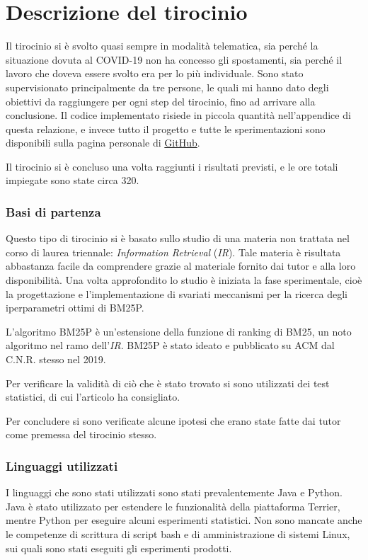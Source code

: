 \chapter{Descrizione del tirocinio}

Il tirocinio si è svolto quasi sempre in modalità telematica,
sia perché la situazione dovuta al COVID-19 non ha concesso
gli spostamenti, sia perché  il lavoro che doveva essere svolto
era per lo più individuale.
Sono stato supervisionato principalmente da tre persone,
le quali mi hanno dato degli obiettivi da raggiungere per ogni
step del tirocinio,
fino ad arrivare alla conclusione.
Il codice implementato risiede in piccola
quantità nell'appendice di questa relazione,
e invece tutto il progetto e tutte le sperimentazioni
sono disponibili sulla pagina personale di \href{https://github.com/federicosilvestri/bm25p-thesis}{GitHub}.

Il tirocinio si è concluso una volta raggiunti i risultati
previsti, e le ore totali impiegate sono state circa 320.

\subsection{Basi di partenza}
Questo tipo di tirocinio si è basato
sullo studio di una materia non trattata nel corso di laurea triennale:
\textit{Information Retrieval} (\textit{IR}).
Tale materia è risultata abbastanza facile da comprendere grazie
al materiale fornito dai tutor e alla loro disponibilità.
Una volta approfondito lo studio è iniziata la fase sperimentale,
cioè la progettazione e l'implementazione di svariati meccanismi per la ricerca 
degli iperparametri ottimi di BM25P.

L'algoritmo BM25P è un'estensione della funzione di ranking
di BM25, un noto algoritmo nel ramo dell'\textit{IR}.
BM25P è stato ideato e pubblicato su ACM dal C.N.R.
stesso nel 2019.\cite{10.1145/3331184.3331373}

Per verificare la validità di ciò che è stato trovato
si sono utilizzati dei test statistici, di cui l'articolo\cite{10.1145/1321440.1321528}
ha consigliato.

Per concludere si sono verificate alcune ipotesi
che erano state fatte dai tutor come premessa
del tirocinio stesso.

\subsection{Linguaggi utilizzati}
I linguaggi che sono stati utilizzati sono stati prevalentemente Java e Python.
Java è stato utilizzato per estendere le funzionalità della piattaforma Terrier,
mentre Python per eseguire alcuni esperimenti statistici.
Non sono mancate anche le competenze di scrittura di script
bash e di amministrazione di sistemi Linux, sui quali sono stati
eseguiti gli esperimenti prodotti.

